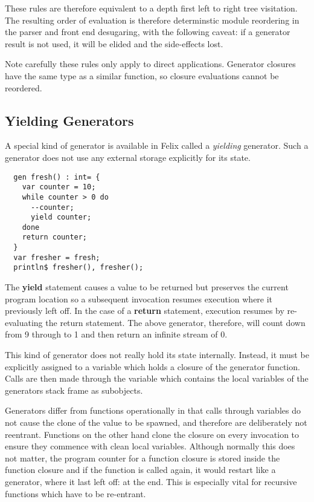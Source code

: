 \documentclass{article}
\begin{document}
These rules are therefore equivalent to a depth first left to
right tree visitation. The resulting order of evaluation is therefore
determinstic module reordering in the parser and front end
desugaring, with the following caveat: if a generator result is
not used, it will be elided and the side-effects lost.

Note carefully these rules only apply to direct applications.
Generator closures have the same type as a similar function,
so closure evaluations cannot be reordered.

\subsection{Yielding Generators}
A special kind of generator is available in Felix
called a {\em yielding} generator. Such a generator
does not use any external storage explicitly for its state.
\begin{verbatim}
  gen fresh() : int= {
    var counter = 10;
    while counter > 0 do
      --counter;
      yield counter;
    done
    return counter;
  }
  var fresher = fresh;
  println$ fresher(), fresher();
\end{verbatim}

The {\bf yield} statement causes a value to be returned
but preserves the current program location so a subsequent
invocation resumes execution where it previously left off.
In the case of a {\bf return} statement, execution resumes
by re-evaluating the return statement. The above generator,
therefore, will count down from 9 through to 1 and then return
an infinite stream of 0.

This kind of generator does not really hold its state internally.
Instead, it must be explicitly assigned to a variable which 
holds a closure of the generator function. Calls are then made
through the variable which contains the local variables of the
generators stack frame as subobjects.

Generators differ from functions operationally in that calls through
variables do not cause the clone of the value to be spawned, and 
therefore are deliberately not reentrant. Functions on the other
hand clone the closure on every invocation to ensure they commence
with clean local variables. Although normally this does not matter,
the program counter for a function closure is stored inside the function
closure and if the function is called again, it would restart
like a generator, where it last left off: at the end. This is
especially vital for recursive functions which have to be re-entrant.
\end{document}
